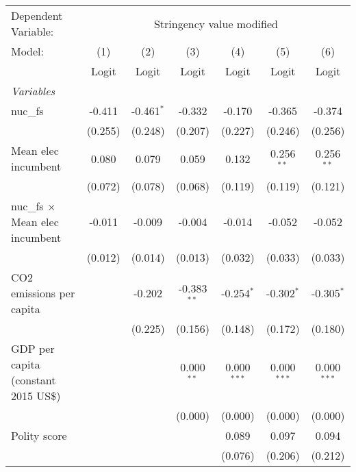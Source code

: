 
\begingroup
\centering
\begin{tabular}{lcccccc}
   \toprule
   Dependent Variable: & \multicolumn{6}{c}{Stringency value modified}\\
   Model:                                 & (1)     & (2)          & (3)           & (4)           & (5)           & (6)\\  
                                          &  Logit  & Logit        & Logit         & Logit         & Logit         & Logit\\  
   \midrule
   \emph{Variables}\\
   nuc\_fs                                & -0.411  & -0.461$^{*}$ & -0.332        & -0.170        & -0.365        & -0.374\\   
                                          & (0.255) & (0.248)      & (0.207)       & (0.227)       & (0.246)       & (0.256)\\   
   Mean elec incumbent                    & 0.080   & 0.079        & 0.059         & 0.132         & 0.256$^{**}$  & 0.256$^{**}$\\   
                                          & (0.072) & (0.078)      & (0.068)       & (0.119)       & (0.119)       & (0.121)\\   
   nuc\_fs $\times$ Mean elec incumbent   & -0.011  & -0.009       & -0.004        & -0.014        & -0.052        & -0.052\\   
                                          & (0.012) & (0.014)      & (0.013)       & (0.032)       & (0.033)       & (0.033)\\   
   CO2 emissions per capita               &         & -0.202       & -0.383$^{**}$ & -0.254$^{*}$  & -0.302$^{*}$  & -0.305$^{*}$\\   
                                          &         & (0.225)      & (0.156)       & (0.148)       & (0.172)       & (0.180)\\   
   GDP per capita (constant 2015 US\$)    &         &              & 0.000$^{**}$  & 0.000$^{***}$ & 0.000$^{***}$ & 0.000$^{***}$\\   
                                          &         &              & (0.000)       & (0.000)       & (0.000)       & (0.000)\\   
   Polity score                           &         &              &               & 0.089         & 0.097         & 0.094\\   
                                          &         &              &               & (0.076)       & (0.206)       & (0.212)\\   

\end{tabular}

